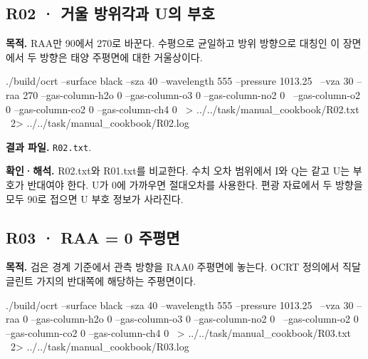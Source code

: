 
\subsection{R02 · 거울 방위각과 U의 부호}
\label{sec:auto:09_cookbook:2.2}

\label{recipe:R02}

\textbf{목적. }RAA만 90\textdegree{}에서 270\textdegree{}로 바꾼다. 수평으로 균일하고 방위 방향으로 대칭인 이 장면에서 두 방향은 태양 주평면에 대한 거울상이다.

\noindent\begin{minipage}{\linewidth}
\begin{ManualCode}

./build/ocrt --surface black --sza 40 --wavelength 555 --pressure 1013.25 \
  --vza 30 --raa 270 --gas-column-h2o 0 --gas-column-o3 0 --gas-column-no2 0 \
  --gas-column-o2 0 --gas-column-co2 0 --gas-column-ch4 0 \
  > ../../task/manual_cookbook/R02.txt \
  2> ../../task/manual_cookbook/R02.log

\end{ManualCode}
\end{minipage}\par

\textbf{결과 파일. }\texttt{R02.txt}.

\textbf{확인·해석. }R02.txt와 R01.txt를 비교한다. 수치 오차 범위에서 I와 Q는 같고 U는 부호가 반대여야 한다. U가 0에 가까우면 절대오차를 사용한다. 편광 자료에서 두 방향을 모두 90\textdegree{}로 접으면 U 부호 정보가 사라진다.

\Needspace{17\baselineskip}

\subsection{R03 · RAA = 0 주평면}
\label{sec:auto:09_cookbook:2.3}

\label{recipe:R03}

\textbf{목적. }검은 경계 기준에서 관측 방향을 RAA0\textdegree{} 주평면에 놓는다. OCRT 정의에서 직달 글린트 가지의 반대쪽에 해당하는 주평면이다.

\noindent\begin{minipage}{\linewidth}
\begin{ManualCode}

./build/ocrt --surface black --sza 40 --wavelength 555 --pressure 1013.25 \
  --vza 30 --raa 0 --gas-column-h2o 0 --gas-column-o3 0 --gas-column-no2 0 \
  --gas-column-o2 0 --gas-column-co2 0 --gas-column-ch4 0 \
  > ../../task/manual_cookbook/R03.txt \
  2> ../../task/manual_cookbook/R03.log

\end{ManualCode}
\end{minipage}\par


